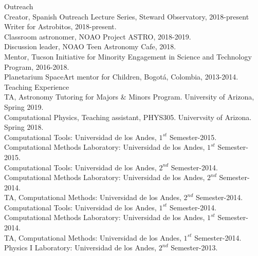 \documentclass[UTF8]{article}
\begin{document}
{\Large Outreach}\\

\indent\indent Creator, Spanish Outreach Lecture Series, Steward Observatory, 2018-present\\

\indent\indent Writer for Astrobitos, 2018-present.\\ 

\indent\indent Classroom astronomer, NOAO Project ASTRO, 2018-2019.\\

\indent\indent Discussion leader, NOAO Teen Astronomy Cafe, 2018.\\

\indent\indent Mentor, Tucson Initiative for Minority Engagement in Science and Technology Program, 2016-2018.\\

\indent\indent Planetarium SpaceArt mentor for Children, Bogot\'a, Colombia, 2013-2014.\\


{\Large Teaching Experience}\\

\indent\indent TA, Astronomy Tutoring for
Majors \& Minors Program. University of Arizona, Spring 2019. \\
\indent\indent Computational Physics, Teaching assistant, PHYS305. Univervsity of Arizona. Spring 2018.\\
\indent\indent Computational Tools: Universidad de los Andes, $1^{st}$ Semester-2015.\\
\indent\indent Computational Methods Laboratory: Universidad de los Andes, $1^{st}$ Semester-2015.\\
\indent\indent Computational Tools: Universidad de los Andes, $2^{nd}$ Semester-2014.\\
\indent\indent Computational Methods Laboratory: Universidad de los Andes, $2^{nd}$ Semester-2014.\\
\indent\indent TA, Computational Methods: Universidad de los Andes, $2^{nd}$ Semester-2014.\\
\indent\indent Computational Tools: Universidad de los Andes, $1^{st}$ Semester-2014.\\
\indent\indent Computational Methods Laboratory: Universidad de los Andes, $1^{st}$ Semester-2014.\\
\indent\indent TA, Computational Methods: Universidad de los Andes, $1^{st}$ Semester-2014.\\
\indent\indent Physics I Laboratory: Universidad de los Andes, $2^{nd}$ Semester-2013.\\
\end{document}
